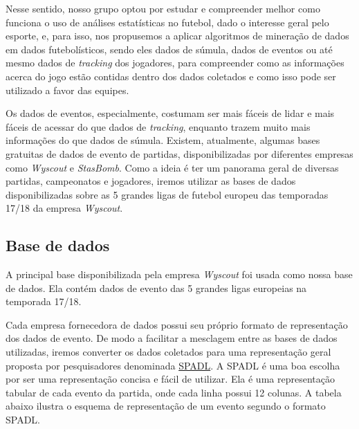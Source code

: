 \documentclass{article}
\begin{document}
Nesse sentido, nosso grupo optou por estudar e compreender melhor como funciona
o uso de análises estatísticas no futebol, dado o interesse geral pelo esporte,
e, para isso, nos propusemos a aplicar algoritmos de mineração de dados em
dados futebolísticos, sendo eles dados de súmula, dados de eventos ou até mesmo
dados de
\textit{tracking} dos jogadores, para compreender como as informações acerca do
jogo estão contidas dentro dos dados coletados e como isso pode ser utilizado a
favor das equipes.

Os dados de eventos, especialmente, costumam ser mais fáceis de lidar e mais
fáceis de acessar do que dados de \textit{tracking}, enquanto trazem muito mais
informações do que dados de súmula. Existem, atualmente, algumas bases
gratuitas de dados de evento de partidas, disponibilizadas por diferentes
empresas como \textit{Wyscout} e \textit{StasBomb}. Como a ideia é ter um
panorama geral de diversas partidas, campeonatos e jogadores, iremos utilizar
as bases de dados disponibilizadas sobre as 5 grandes ligas de futebol europeu
das temporadas 17/18 da empresa \textit{Wyscout}.

\subsection{Base de dados}

A principal base disponibilizada pela empresa \textit{Wyscout} foi usada como
nossa base de dados. Ela contém dados de evento das 5 grandes ligas europeias na
temporada 17/18.

Cada empresa fornecedora de dados possui seu próprio formato de representação
dos dados de evento. De modo a facilitar a mesclagem entre as bases de dados
utilizadas, iremos converter os dados coletados para uma representação geral
proposta por pesquisadores denominada
\href{https://socceraction.readthedocs.io/en/latest/documentation/spadl/spadl.html}{SPADL}.
A SPADL é uma boa escolha por ser uma representação concisa e fácil de
utilizar. Ela é uma representação tabular de cada evento da partida, onde cada
linha possui 12 colunas. A tabela abaixo ilustra o esquema de representação de
um evento segundo o formato SPADL.
\end{document}
